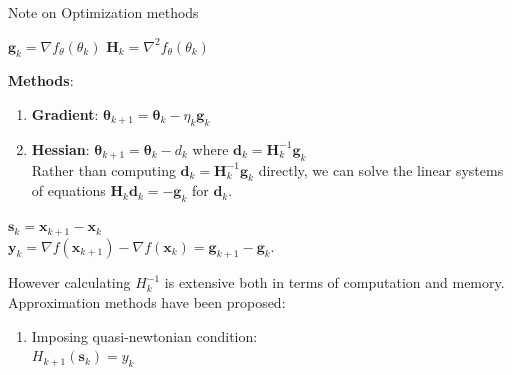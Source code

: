 \documentclass{beamer}
\begin{document}
\begin{frame}[allowframebreaks]{Note on Optimization methods}

    \begin{center}
        $\mathbf{g}_k = \nabla f_{\theta}(\theta_k) $ \hspace{10mm}
        $\mathbf{H}_k = \nabla^{2} f_{\theta}(\theta_k)$
    \end{center}

    \textbf{Methods}:
    \begin{enumerate}
        \item \textbf{Gradient}: $\boldsymbol{\theta}_{k+1} =
            \boldsymbol{\theta}_k - \eta_k \mathbf{g}_k$
        \item \textbf{Hessian}: $\boldsymbol{\theta}_{k+1} = \boldsymbol{\theta}_k - d_k$
            where $\mathbf{d}_k = \mathbf{H}_k^{-1} \mathbf{g}_k$ \\
            Rather than computing $\mathbf{d}_k = \mathbf{H}_k^{-1} \mathbf{g}_k$ directly,
            we can solve the linear systems of equations
            $\mathbf{H}_k \mathbf{d}_k = -\mathbf{g}_k$ for $\mathbf{d}_k$.
    \end{enumerate}
    \newpage
    \begin{center}
        $\mathbf{s}_k = \mathbf {x} _{k+1}-\mathbf {x} _{k}$\\
        $\mathbf{y}_k = \nabla f(\mathbf {x} _{k+1})-
                    \nabla f(\mathbf {x} _{k})
                                = \mathbf{g}_{k+1} - \mathbf{g}_{k}$. \\
    \end{center}
    However calculating $H^{-1}_k$ is extensive both in terms of computation and
    memory. Approximation methods have been proposed:
    \begin{enumerate}
        \item Imposing quasi-newtonian condition: \\
            $H_{k+1}(\mathbf{s}_k)=y_k$\\


\end{enumerate}
\end{frame}
\end{document}
